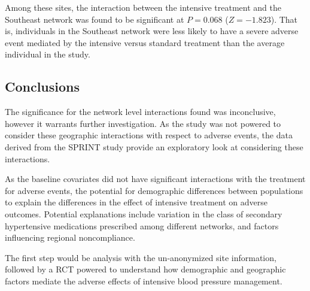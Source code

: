 \documentclass[10pt]{article}
\begin{document}
Among these sites, the interaction between the intensive treatment and the
Southeast network was found to be significant at $P = 0.068$ ($Z =
-1.823$). That is, individuals in the Southeast network were less
likely to have a severe adverse event mediated by the intensive versus
standard treatment than the average individual in the study.

\subsection{Conclusions}
The significance for the network level interactions found was inconclusive,
however it warrants further investigation. As the study was not powered to
consider these geographic interactions with respect to adverse events, the data
derived from the SPRINT study provide an exploratory look at considering these
interactions.

As the baseline covariates did not have significant interactions with
the treatment for adverse events, the potential for demographic
differences between populations to explain the differences in the
effect of intensive treatment on adverse outcomes. Potential
explanations include variation in the class of secondary hypertensive
medications prescribed among different networks, and factors
influencing regional noncompliance.

The first step would be analysis with the un-anonymized site
information, followed by a RCT powered to understand how demographic and
geographic factors mediate the adverse effects of intensive blood pressure
management.
\end{document}
